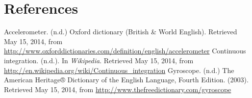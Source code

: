 \documentclass[11pt,twoside,a4paper]{article}
\begin{document}
\clearpage

\section*{References}
Accelerometer. (n.d.) Oxford dictionary (British \& World English). Retrieved May 15, 2014, from \url{http://www.oxforddictionaries.com/definition/english/accelerometer}
\newline \newline
Continuous integration. (n.d.). In \textit{Wikipedia}. Retrieved May 15, 2014, from \url{http://en.wikipedia.org/wiki/Continuous_integration}
\newline \newline
Gyroscope. (n.d.) The American Heritage® Dictionary of the English Language, Fourth Edition. (2003). Retrieved May 15, 2014, from \url{http://www.thefreedictionary.com/gyroscope}
\end{document}
